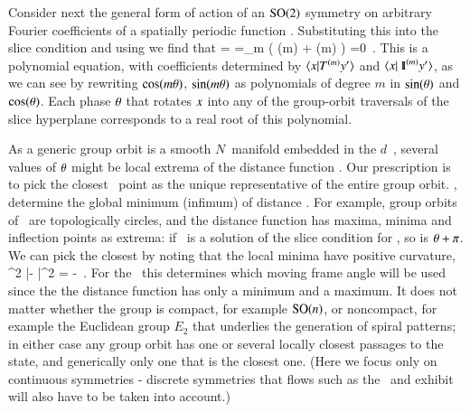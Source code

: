 \documentclass[preprint,12pt]{elsarticle} %
\begin{document}
Consider next the general form  of action of an
$\textrm{SO}(2)$ symmetry on arbitrary Fourier coefficients of a spatially
periodic function . Substituting this into the slice
condition  and using  we find that
\bea
{}
=
\continue
=\sum\limits_m
   \left(
     \cos(m\gSpace)
  +  \sin(m\gSpace)
   \right)
   =0
\,.
\label{eq:so2sing}
\eea
This is a polynomial equation, with coefficients determined by
$\braket{\ssp}{\Lg^{(m)} \slicep}$ and $\braket{\ssp}{\id^{(m)}\slicep}$,
as we can see by rewriting $\cos(m{\bf \theta})$, $\sin(m{\bf \theta})$ as
polynomials of degree $m$ in $\sin({\bf \theta})$ and $\cos({\bf \theta})$. Each
phase ${\bf \theta}$ that rotates $x$ into any of the group-orbit
traversals of the slice hyperplane corresponds to a real root of this
polynomial.

As a generic group orbit is a smooth $N$\dmn\ manifold embedded in the
$d$\dmn\ \statesp, several values of ${\bf \theta}$ might be local extrema of
the distance function .
Our prescription is to pick the closest \reducedsp\ point as the unique
representative of the entire group orbit. \ie, determine the global
minimum (infimum) of distance .
For example, group orbits of
\ are topologically circles, and the distance function
has maxima, minima and inflection points as extrema:
if \gSpace\ is a solution of the slice condition 
for \cLe,
so is ${\bf \theta}+\pi$. We can pick the closest by noting that
the local minima have positive curvature,
\beq
{}
     {\partial \gSpace^2}
        |\sspRed - \slicep|^2
    =
-  \braket{\sspRed}{\Lg^2\slicep}
\,.
For the \cLe\, this determines which moving frame angle will be used since the
the distance function  has
only a minimum and a maximum.
It does not matter
whether the group is compact, for example $\textrm{SO}(n)$, or noncompact, for
example the Euclidean group $E_2$ that underlies the generation of spiral
patterns; in either case any group orbit has one or several
locally closest passages to the {\template} state, and generically only
one that is the closest one.
(Here we focus only on continuous symmetries - discrete symmetries that
flows such as the \KS\ and {\pCf} exhibit will also have to be taken into
account.)
\end{document}
